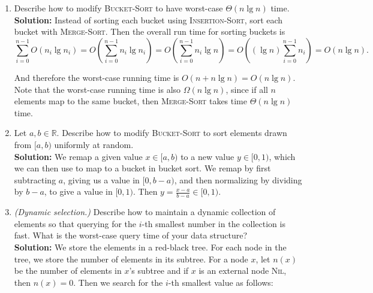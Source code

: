 \documentclass[letterpaper,11pt]{article}
\begin{document}
\thispagestyle{plain}


 \\

 \\

\begin{enumerate}
\item Describe how to modify \textsc{Bucket-Sort} to have worst-case $\Theta(n\lg n)$ time.\\

\textbf{Solution:} Instead of sorting each bucket using \textsc{Insertion-Sort}, sort each bucket with \textsc{Merge-Sort}. Then the overall run time for sorting buckets is
\[\sum_{i=0}^{n-1}O(n_i\lg n_i)  = O\left(\sum_{i=0}^{n-1}n_i\lg n_i\right) = O\left(\sum_{i=0}^{n-1}n_i\lg n\right) = O\left((\lg n)\sum_{i=0}^{n-1}n_i\right) = O(n\lg n).\]

And therefore the worst-case running time is $O(n + n\lg n) = O(n\lg n)$. Note that the worst-case running time is also $\Omega(n\lg n)$, since if all $n$ elements map to the same bucket, then \textsc{Merge-Sort} takes time $\Theta(n\lg n)$ time.

\item Let $a,b\in \mathbb{R}$. Describe how to modify \textsc{Bucket-Sort} to sort elements drawn from $[a,b)$ uniformly at random.\\

\textbf{Solution:} We remap a given value $x\in [a,b)$ to a new value $y \in [0,1)$, which we can then use to map to a bucket in bucket sort. We remap by first subtracting $a$, giving us a value in $[0,b-a)$, and then normalizing by dividing by $b-a$, to give a value in $[0,1)$. Then $y = \frac{x-a}{b-a} \in [0,1)$.

\item \emph{(Dynamic selection.)} Describe how to maintain a dynamic collection of elements so that querying for the $i$-th smallest number in the collection is fast. What is the worst-case query time of your data structure?\\

\textbf{Solution:} We store the elements in a red-black tree. For each node in the tree, we store the number of elements in its subtree. For a node $x$, let $n(x)$ be the number of elements in $x$'s subtree and if $x$ is an external node \textsc{Nil}, then $n(x) = 0$. Then we search for the $i$-th smallest value as follows:


\end{enumerate}
\end{document}
